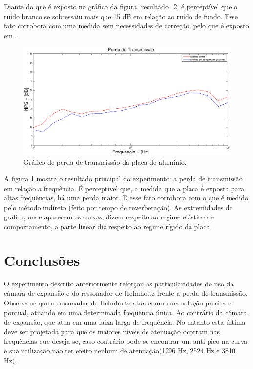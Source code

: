 Diante do que é exposto no gráfico da figura \ref{resultado_2} é perceptível que o ruído branco se sobressaiu mais que 15 dB em relação ao ruído de fundo. Esse fato corrobora com uma medida sem necessidades de correção, pelo que é exposto em \cite{silva2009simulaccao}.

\newpage
\begin{figure}[h]
\hspace{-4.5cm}
\includegraphics[scale=0.6]{codigo/perda_transmissao.eps}
\caption{Gráfico de perda de transmissão da placa de alumínio.}
\label{resultado_3}
\end{figure}

A figura \ref{resultado_3} mostra o resultado principal do experimento: a perda de transmissão em relação a frequência. É perceptível que, a medida que a placa é exposta para altas frequências, há uma perda maior. E esse fato corrobora com o que é medido pelo método indireto (feito por tempo de reverberação). As extremidades do gráfico, onde aparecem as curvas, dizem respeito ao regime elástico de comportamento, a parte linear diz respeito ao regime rígido da placa.


\chapter{Conclusões}\label{conclusoes}

O experimento descrito anteriormente reforçou as particularidades do uso da câmara de expansão e do ressonador de Helmholtz frente a perda de transmissão. Observa-se que o ressonador de Helmholtz atua como uma solução precisa e pontual, atuando em uma determinada frequência única. Ao contrário da câmara de expansão, que atua em uma faixa larga de frequência. No entanto esta última deve ser projetada para que os maiores níveis de atenuação ocorram nas frequências que deseja-se, caso contrário pode-se encontrar um anti-pico na curva e sua utilização não ter efeito nenhum de atenuação(1296 Hz, 2524 Hz e 3810 Hz).